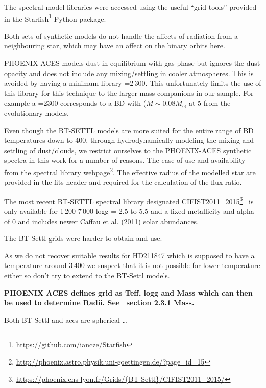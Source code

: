 The spectral model libraries were accessed using the useful ``grid tools'' provided in the Starfish\footnote{\url{https://github.com/iancze/Starfish}} Python package\citep{czekala_constructing_2015}.


Both sets of synthetic models do not handle the affects of radiation from a neighbouring star, which may have an affect on the binary orbits here.



{PHOENIX-ACES} models dust in equilibrium with gas phase but ignores the dust opacity and does not include any mixing/settling in cooler atmospheres. This is avoided by having a minimum library \teff{}=2\,300\K{}. This unfortunately limits the use of this library for this technique to the larger mass companions in our sample. For example a \teff{}=2300\K{} corresponds to a BD with (\(M\sim0.08 M_{\odot}\) at 5\Gyr{} from the~\citet{baraffe_evolutionary_2003} evolutionary models.


Even though the BT-SETTL models are more suited for the entire range of BD temperatures down to 400\K{}, through hydrodynamically modeling the mixing and settling of dust/clouds, we restrict ourselves to the {PHOENIX-ACES} synthetic spectra in this work for a number of reasons. The ease of use and availability from the spectral library webpage\footnote{\url{http://phoenix.astro.physik.uni-goettingen.de/?page_id=15}}. The effective radius of the modelled star are provided in the fits header and required for the calculation of the flux ratio.



The most recent BT-SETTL spectral library designated CIFIST2011\_2015\footnote{\url{https://phoenix.ens-lyon.fr/Grids/{BT-Settl}/CIFIST2011_2015/}}~\citep{baraffe_new_2015} is only available for 1\,200-7\,000\K{} logg = 2.5 to 5.5 and a fixed metallicity and alpha of 0 and includes newer Caffau et al. (2011) solar abundances.

The {BT-Settl} grids were harder to obtain and use.

As we do not recover suitable results for HD211847 which is supposed to have a temperature around 3\,400\K{} we suspect that it is not possible for lower temperature either so don't try to extend to the {BT-Settl} models.


\textbf{
    PHOENIX ACES defines grid as Teff, logg and Mass which can then be used to determine Radii. See~\citep{husser_new_2013} section 2.3.1 Mass.}

Both {BT-Settl} and aces are spherical
\ldots{}




